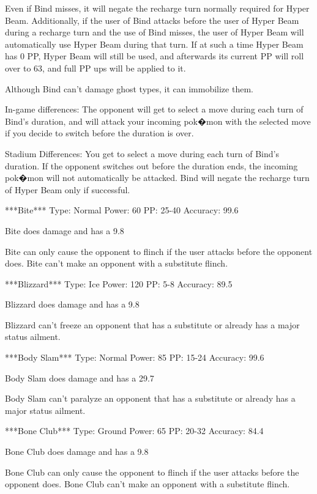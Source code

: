 \documentclass[reprint, aps, prl, paper=A4]{revtex4-1}
\begin{document}
Even if Bind misses, it will negate the recharge turn normally required for Hyper Beam.
Additionally, if the user of Bind attacks before the user of Hyper Beam during a recharge turn
and the use of Bind misses, the user of Hyper Beam will automatically use Hyper Beam during
that turn. If at such a time Hyper Beam has 0 PP, Hyper Beam will still be used, and afterwards
its current PP will roll over to 63, and full PP ups will be applied to it.

Although Bind can't damage ghost types, it can immobilize them.

In-game differences:
The opponent will get to select a move during each turn of Bind's duration, and will attack
your incoming pok�mon with the selected move if you decide to switch before the duration is
over.

Stadium Differences:
You get to select a move during each turn of Bind's duration. If the opponent switches out
before the duration ends, the incoming pok�mon will not automatically be attacked. Bind will
negate the recharge turn of Hyper Beam only if successful.


***Bite***
Type: Normal
Power: 60
PP: 25-40
Accuracy: 99.6%

Bite does damage and has a 9.8%

Bite can only cause the opponent to flinch if the user attacks before the opponent does. Bite
can't make an opponent with a substitute flinch.


***Blizzard***
Type: Ice
Power: 120
PP: 5-8
Accuracy: 89.5%

Blizzard does damage and has a 9.8%

Blizzard can't freeze an opponent that has a substitute or already has a major status ailment.


***Body Slam***
Type: Normal
Power: 85
PP: 15-24
Accuracy: 99.6%

Body Slam does damage and has a 29.7%

Body Slam can't paralyze an opponent that has a substitute or already has a major status
ailment.


***Bone Club***
Type: Ground
Power: 65
PP: 20-32
Accuracy: 84.4%

Bone Club does damage and has a 9.8%

Bone Club can only cause the opponent to flinch if the user attacks before the opponent does.
Bone Club can't make an opponent with a substitute flinch.
\end{document}

